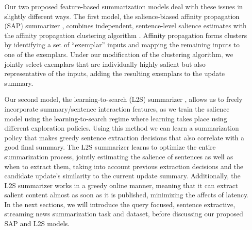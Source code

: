 Our two proposed feature-based summarization models deal with these issues in
slightly different ways.  The first model, the salience-biased affinity
propagation (SAP) summarizer \citep{kedzie2015}, combines independent,
sentence-level salience estimates with the affinity propagation clustering
algorithm \citep{frey2007}. Affinity propagation forms clusters by identifying
a set of ``exemplar'' inputs and mapping the remaining inputs to one of the
exemplars. Under our modification of the clustering algorithm, we jointly
select exemplars that are individually highly salient but also representative
of the inputs, adding the resulting exemplars to the  update summary.

Our second model, the learning-to-search (L2S) summarizer \citep{kedzie2016},
allows us to freely incorporate summary/sentence interaction features, as we
train the salience model using the learning-to-search regime
\citep{daume2005,chang2015} where learning takes place using different
exploration policies. Using this method we can learn a summarization policy
that makes greedy sentence extraction decisions that also correlate with a good
final summary. The L2S summarizer learns to optimize the entire summarization
process, jointly estimating the salience of sentences as well as when to
extract them, taking into account previous extraction decisions and the
candidate update's similarity to the current update summary. Additionally, the
L2S summarizer works in a greedy online manner, meaning that it can extract
salient content almost as soon as it is published, minimizing the affects of
latency.  In the next sections, we will introduce the query focused, sentence
extractive, streaming news summarization task and dataset, before discussing
our proposed SAP and L2S models.
